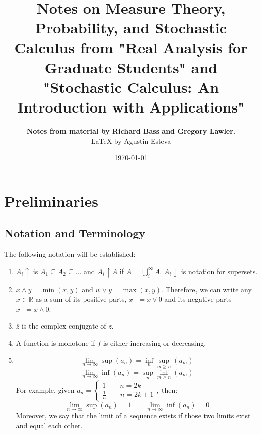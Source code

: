 \documentclass[oneside]{book}
\newcommand{\bbR}{\mathbb{R}}
\def\notetitle{Notes on Measure Theory, Probability, and Stochastic Calculus from "Real Analysis for Graduate Students" and "Stochastic Calculus: An Introduction with Applications"}
\def\noteauthor{
    \textbf{Notes from material by Richard Bass and Gregory Lawler.} \\ 
    {\LaTeX} by Agustin Esteva}
\def\notedate{\today}
\begin{document}
\title{\textbf{
    \LARGE{\notetitle} \vspace*{10\baselineskip}}
    }
\author{\noteauthor}
\date{\notedate}

\maketitle
\newpage

\tableofcontents
\newpage


\chapter{Preliminaries}
\section{Notation and Terminology}
The following notation will be established:
\begin{enumerate}
    \item $A_i\uparrow$ is $A_1 \subseteq A_2 \subseteq \dots$ and $A_i \uparrow A$ if $A = \displaystyle\bigcup_i^\infty A.$ $A_i \downarrow$ is notation for supersets.
    \item $x\wedge y = \min(x,y)$ and $w \vee y = \max(x,y).$ Therefore, we can write any $x \in \bbR$ as a sum of its positive parts, $x^+ = x \vee 0$ and its negative parts $x^- = x \wedge 0.$
    \item $\overline{z}$ is the complex conjugate of $z.$
    \item A function is monotone if $f$ is either increasing or decreasing.
    \item \[\lim_{n\to \infty}\sup(a_n) = \inf_n\sup_{m\geq n}(a_m)\]
    \[\lim_{n\to \infty}\inf(a_n) = \sup_n\inf_{m\geq n}(a_m)\]
    For example, given $a_n = \begin{cases}
        1 \qquad n = 2k\\
        \frac{1}{n} \qquad n = 2k+1
    \end{cases},$ then:
    \[\lim_{n\to \infty}\sup(a_n) = 1\qquad \lim_{n\to \infty}\inf(a_n) = 0\] Moreover, we say that the limit of a sequence exists if those two limits exist and equal each other.
\end{enumerate}
\end{document}
